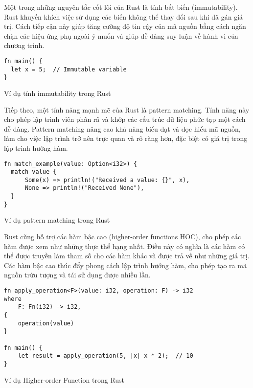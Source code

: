 Một trong những nguyên tắc cốt lõi của Rust là tính bất biến (immutability). Rust khuyến khích việc sử dụng các biến không thể thay đổi sau khi đã gán giá trị. Cách tiếp cận này giúp tăng cường độ tin cậy của mã nguồn bằng cách ngăn chặn các hiệu ứng phụ ngoài ý muốn và giúp dễ dàng suy luận về hành vi của chương trình.

\begin{listing}[H]
\begin{verbatim}
fn main() {
  let x = 5;  // Immutable variable
}
\end{verbatim}
\caption{Ví dụ tính immutability trong Rust}
\label{fp:immutable}
\end{listing}

Tiếp theo, một tính năng mạnh mẽ của Rust là pattern matching. Tính năng này cho phép lập trình viên phân rã và khớp các cấu trúc dữ liệu phức tạp một cách dễ dàng. Pattern matching nâng cao khả năng biểu đạt và đọc hiểu mã nguồn, làm cho việc lập trình trở nên trực quan và rõ ràng hơn, đặc biệt có giá trị trong lập trình hướng hàm.

\begin{listing}[H]
\begin{verbatim}
fn match_example(value: Option<i32>) {
  match value {
      Some(x) => println!("Received a value: {}", x),
      None => println!("Received None"),
  }
}
\end{verbatim}
\caption{Ví dụ pattern matching  trong Rust}
\label{fp:patternmatching}
\end{listing}

Rust cũng hỗ trợ các hàm bậc cao (higher-order functions HOC), cho phép các hàm được xem như những thực thể hạng nhất. Điều này có nghĩa là các hàm có thể được truyền làm tham số cho các hàm khác và được trả về như những giá trị. Các hàm bậc cao thúc đẩy phong cách lập trình hướng hàm, cho phép tạo ra mã nguồn trừu tượng và tái sử dụng được nhiều lần.

\begin{listing}[H]
\begin{verbatim}
fn apply_operation<F>(value: i32, operation: F) -> i32
where
    F: Fn(i32) -> i32,
{
    operation(value)
}

fn main() {
    let result = apply_operation(5, |x| x * 2);  // 10
}
\end{verbatim}
\caption{Ví dụ Higher-order Function trong Rust}
\label{fp:hoc}
\end{listing}

